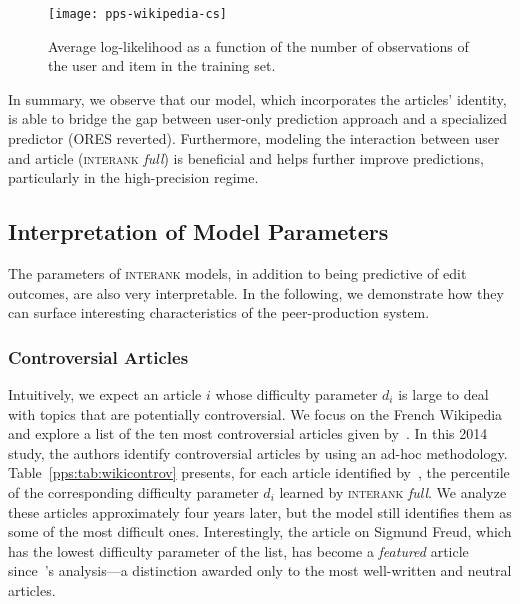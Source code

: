 \begin{figure}
	\centering
	\texttt{[image: pps-wikipedia-cs]}
	\caption{Average log-likelihood as a function of the number of observations of the user and item in the training set.}
	\label{pps:fig:wikics}
\end{figure}

In summary, we observe that our model, which incorporates the articles' identity, is able to bridge the gap between user-only prediction approach and a specialized predictor (ORES reverted).
Furthermore, modeling the interaction between user and article (\textsc{interank} \emph{full}) is beneficial and helps further improve predictions, particularly in the high-precision regime.

\subsection{Interpretation of Model Parameters}

The parameters of \textsc{interank} models, in addition to being predictive of edit outcomes, are also very interpretable.
In the following, we demonstrate how they can surface interesting characteristics of the peer-production system.

\subsubsection{Controversial Articles}
Intuitively, we expect an article $i$ whose difficulty parameter $d_i$ is large to deal with topics that are potentially controversial.
We focus on the French Wikipedia and explore a list of the ten most controversial articles given by~\citet{yasseri2014most}.
In this 2014 study, the authors identify controversial articles by using an ad-hoc methodology.
Table~\ref{pps:tab:wikicontrov} presents, for each article identified by~\citeauthor{yasseri2014most}, the percentile of the corresponding difficulty parameter $d_i$ learned by \textsc{interank} \emph{full}.
We analyze these articles approximately four years later, but the model still identifies them as some of the most difficult ones.
Interestingly, the article on Sigmund Freud, which has the lowest difficulty parameter of the list, has become a \emph{featured} article since~\citeauthor{yasseri2014most}'s analysis---a distinction awarded only to the most well-written and neutral articles.

